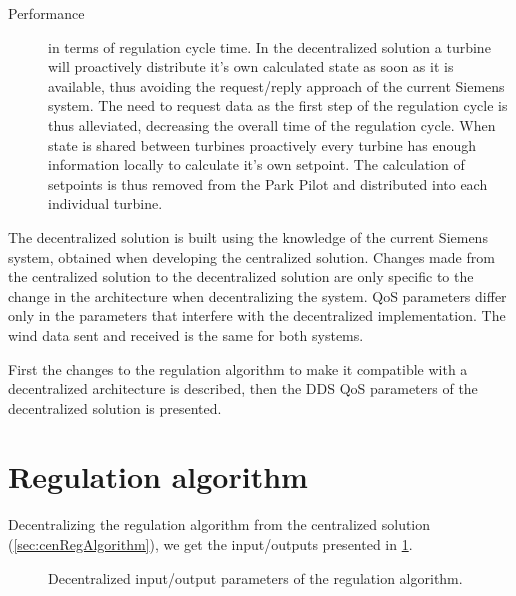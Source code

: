 \begin{description}
	\item[Performance] in terms of regulation cycle time. In the decentralized solution a turbine will proactively distribute it's own calculated state as soon as it is available, thus avoiding the request/reply approach of the current Siemens system. The need to request data as the first step of the regulation cycle is thus alleviated, decreasing the overall time of the regulation cycle. When state is shared between turbines proactively every turbine has enough information locally to calculate it's own setpoint. The calculation of setpoints is thus removed from the Park Pilot and distributed into each individual turbine. 
\end{description}


\noindent The decentralized solution is built using the knowledge of the current Siemens system, obtained when developing the centralized solution. Changes made from the centralized solution to the decentralized solution are only specific to the change in the architecture when decentralizing the system. QoS parameters differ only in the parameters that interfere with the decentralized implementation. The wind data sent and received is the same for both systems.

First the changes to the regulation algorithm to make it compatible with a decentralized architecture is described, then the DDS QoS parameters of the decentralized solution is presented.

\section{Regulation algorithm}

Decentralizing the regulation algorithm from the centralized solution (\cref{sec:cenRegAlgorithm}), we get the input/outputs presented in \cref{fig:ioDecenRegAlg}.

\begin{figure}[!h]
	\centering
	

	\caption[Decentralized input/output parameters of the regulation algorithm]{
		\label{fig:ioDecenRegAlg} 
		\footnotesize{%
			Decentralized input/output parameters of the regulation algorithm.
		}
	}
\end{figure}

